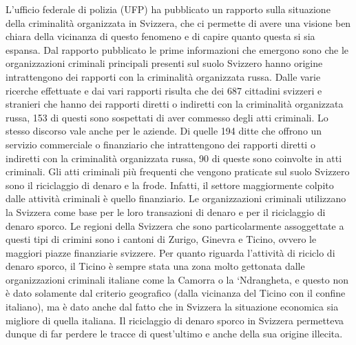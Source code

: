 \documentclass[a4paper, 11pt]{article}
\begin{document}

L’ufficio federale di polizia (UFP) ha pubblicato un rapporto sulla situazione della criminalità organizzata in Svizzera, che ci permette di avere una visione ben chiara della vicinanza di questo fenomeno e di capire quanto questa si sia espansa. Dal rapporto pubblicato le prime informazioni che emergono sono che le organizzazioni criminali principali presenti sul suolo Svizzero hanno origine intrattengono dei rapporti con la criminalità organizzata russa. Dalle varie ricerche effettuate e dai vari rapporti risulta che dei 687 cittadini svizzeri e stranieri che hanno dei rapporti diretti o indiretti con la criminalità organizzata russa, 153 di questi sono sospettati di aver commesso degli atti criminali. Lo stesso discorso vale anche per le aziende. Di quelle 194 ditte che offrono un servizio commerciale o finanziario che intrattengono dei rapporti diretti o indiretti con la criminalità organizzata russa, 90 di queste sono coinvolte in atti criminali. Gli atti criminali più frequenti che vengono praticate sul suolo Svizzero sono il riciclaggio di denaro e la frode. Infatti, il settore maggiormente colpito dalle attività criminali è quello finanziario. Le organizzazioni criminali utilizzano la Svizzera come base per le loro transazioni di denaro e per il riciclaggio di denaro sporco. Le regioni della Svizzera che sono particolarmente assoggettate a questi tipi di crimini sono i cantoni di Zurigo, Ginevra e Ticino, ovvero le maggiori piazze finanziarie svizzere. Per quanto riguarda l’attività di riciclo di denaro sporco, il Ticino è sempre stata una zona molto gettonata dalle organizzazioni criminali italiane come la Camorra o la ‘Ndrangheta, e questo non è dato solamente dal criterio geografico (dalla vicinanza del Ticino con il confine italiano), ma è dato anche dal fatto che in Svizzera la situazione economica sia migliore di quella italiana. Il riciclaggio di denaro sporco in Svizzera permetteva dunque di far perdere le tracce di quest’ultimo e anche della sua origine illecita.
\end{document}
